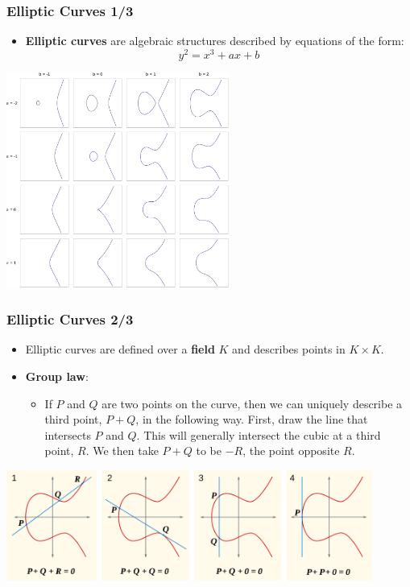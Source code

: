 \documentclass{beamer}
\begin{document}
\begin{frame}
  \frametitle{Elliptic Curves 1/3}
  \begin{itemize}
  \item \textbf{Elliptic curves} are algebraic structures described by equations
    of the form:
    $$y^2 = x^3 + ax + b$$
  \end{itemize}
  \begin{center}
    \includegraphics[width=0.55\textwidth]{ec}
  \end{center}
\end{frame}

\begin{frame}
  \frametitle{Elliptic Curves 2/3}
  \begin{itemize}
  \item Elliptic curves are defined over a \textbf{field} $K$ and describes
    points in $K \times K$.
  \item \textbf{Group law}:
    \begin{itemize}
    \item If $P$ and $Q$ are two points on the curve, then we can uniquely
      describe a third point, $P + Q$, in the following way. First, draw the
      line that intersects $P$ and $Q$. This will generally intersect the cubic
      at a third point, $R$. We then take $P + Q$ to be $-R$, the point opposite
      $R$.
    \end{itemize}
  \end{itemize}
  \begin{center}
    \includegraphics[width=0.9\textwidth]{ec_group}
  \end{center}
\end{frame}
\end{document}
